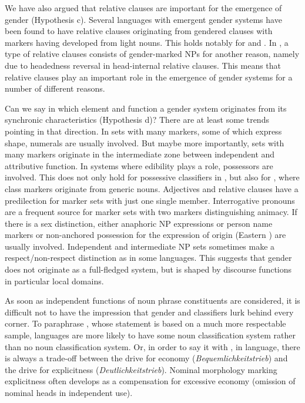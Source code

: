 \documentclass[output=collectionpaper]{langsci/langscibook}
\begin{document}
We have also argued that relative clauses are important for the emergence of gender (Hypothesis c). Several languages with emergent gender systems have been found to have relative clauses originating from gendered clauses with markers having developed from light nouns. This holds notably for  and . In , a type of relative clauses consists of gender-marked NPs for another reason, namely due to headedness reversal in head-internal relative clauses. This means that relative clauses play an important role in the emergence of gender systems for a number of different reasons.

Can we say in which element and function a gender system originates from its synchronic characteristics (Hypothesis d)? There are at least some trends pointing in that direction. In sets with many markers, some of which express shape, numerals are usually involved. But maybe more importantly, sets with many markers originate in the intermediate zone between independent and attributive function. In systems where edibility plays a role, possessors are involved. This does not only hold for possessive classifiers in , but also for , where class markers originate from generic nouns. Adjectives and relative clauses have a predilection for marker sets with just one single member. Interrogative pronouns are a frequent source for marker sets with two markers distinguishing animacy. If there is a sex distinction, either anaphoric NP expressions or person name markers or non-anchored possession for the expression of origin (Eastern ) are usually involved. Independent and intermediate NP sets sometimes make a respect/non-respect distinction as in some  languages. This suggests that gender does not originate as a full-fledged system, but is shaped by discourse functions in particular local domains.

As soon as independent functions of noun phrase constituents are considered, it is difficult not to have the impression that gender and classifiers lurk behind every corner. To paraphrase , whose statement is based on a much more respectable sample, languages are more likely to have some noun classification system rather than no noun classification system. Or, in order to say it with \cite{Gabelentz1891}, in language, there is always a trade-off between the drive for economy (\textit{Bequemlichkeitstrieb}) and the drive for explicitness (\textit{Deutlichkeitstrieb}). Nominal morphology marking explicitness often develops as a compensation for excessive economy (omission of nominal heads in independent use).
\end{document}
